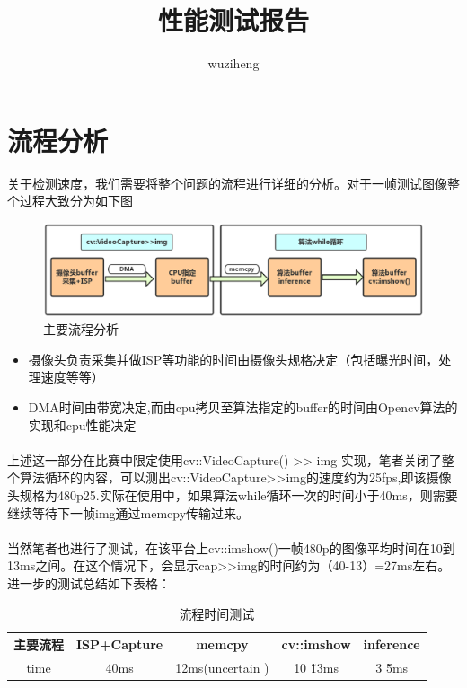 \documentclass{article}
\title{性能测试报告}
\author{wuziheng}
\begin{document}
\maketitle
\section{流程分析}关于检测速度，我们需要将整个问题的流程进行详细的分析。对于一帧测试图像整个过程大致分为如下图
	\begin{figure}[ht]

	\centering
	\includegraphics[scale=0.35]{pic/isp.eps}
	\caption{主要流程分析}
	\label{fig:label}
	\end{figure}

	\begin{itemize}
	\item 摄像头负责采集并做ISP等功能的时间由摄像头规格决定（包括曝光时间，处理速度等等）
	\item DMA时间由带宽决定,而由cpu拷贝至算法指定的buffer的时间由Opencv算法的实现和cpu性能决定
	\end{itemize}

\paragraph{}上述这一部分在比赛中限定使用cv::VideoCapture() >> img 实现，笔者关闭了整个算法循环的内容，可以测出cv::VideoCapture>>img的速度约为25fps,即该摄像头规格为480p25.实际在使用中，如果算法while循环一次的时间小于40ms，则需要继续等待下一帧img通过memcpy传输过来。

\paragraph{}当然笔者也进行了测试，在该平台上cv::imshow()一帧480p的图像平均时间在10到13ms之间。在这个情况下，会显示cap>>img的时间约为（40-13）=27ms左右。进一步的测试总结如下表格：

	\begin{table}[h]
		\centering
  		\begin{tabulary}{1.2\textwidth}{CCCCC}
  		主要流程 & ISP+Capture  & memcpy & cv::imshow & inference \\
    	\hline
		 time  & 40ms & 12ms(uncertain )& 10 \~ 13ms & 3 \~ 5ms \\
  		\end{tabulary}  
  		\caption{流程时间测试}
		\label{tab:Margin_settings}
	\end{table}
\end{document}
